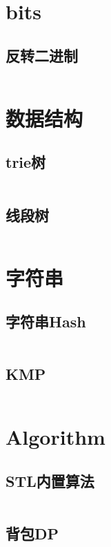 \documentclass[openany,a4paper]{article}
\begin{document}
\tableofcontents

\section{bits}

\subsection{反转二进制}
\inputminted{cpp}{model/bits/bits.h}

\section{数据结构}

\subsection{trie树}
\inputminted{cpp}{model/dataStruct/trie.h}

\subsection{线段树}
\inputminted{cpp}{model/dataStruct/segmentTree.h}

\section{字符串}

\subsection{字符串Hash}
\inputminted{cpp}{model/string/hash.h}

\subsection{KMP}
\inputminted{cpp}{model/string/kmp.h}

\section{Algorithm}

\subsection{STL内置算法}
\inputminted{cpp}{model/algorithm/STL.h}

\subsection{背包DP}
\inputminted{cpp}{model/algorithm/dp.h}
\end{document}
